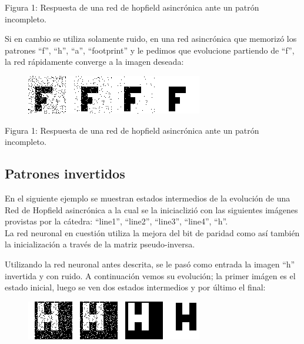 \documentclass[%
    final,
    reprint,
    notitlepage,
    narroweqnarray,
    inline,
    twoside,
    invited
    ]{ieee}
\begin{document}
\begin{center}
\par Figura 1: Respuesta de una red de hopfield asincrónica ante un patrón incompleto.
\end{center}

\par Si en cambio se utiliza solamente ruido, en una red asincrónica que memorizó los patrones ``f'', ``h'', ``a'', ``footprint'' y le pedimos que evolucione partiendo de ``f'', la red rápidamente converge a la imagen deseada:

\begin{figure}[H]
\begin{center}
\includegraphics[scale=0.60]{./images/noisyf.png}
\label{modelado}
\end{center}
\end{figure}

\begin{center}
\par Figura 1: Respuesta de una red de hopfield asincrónica ante un patrón incompleto.
\end{center}




\subsection{Patrones invertidos}

\par En el siguiente ejemplo se muestran estados intermedios de la evolución de una Red de Hopfield asincrónica a la cual se la iniciaclizió con las siguientes imágenes provistas por la cátedra: ``line1'', ``line2'', ``line3'', ``line4'', ``h''.\\
La red neuronal en cuestión utiliza la mejora del bit de paridad como así también la inicialización a través de la matriz pseudo-inversa.\\
\par Utilizando la red neuronal antes descrita, se le pasó como entrada la imagen ``h'' invertida y con ruido. A continuación vemos su evolución; la primer imágen es el estado inicial, luego se ven dos estados intermedios y por último el final:\\

\begin{figure}[H]
\begin{center}
\includegraphics[scale=0.60]{./images/hinvypar.png}
\label{modelado}
\end{center}
\end{figure}
\end{document}
